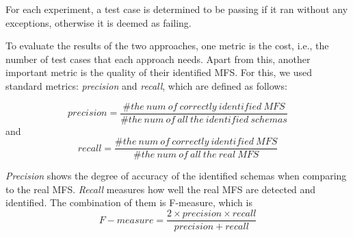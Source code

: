 \documentclass{sig-alternate}
\begin{document}
For each experiment, a test case is determined to be passing if it ran without any exceptions, otherwise it is deemed as failing.

To evaluate the results of the two approaches, one metric is the cost, i.e., the number of test cases that each approach needs. Apart from this, another important metric is the quality of their identified MFS. For this, we used standard metrics: \emph{precision} and \emph{recall}, which are defined as follows:

$$precision =  \frac{\#the\ num\ of\ correctly\ identified\  MFS}{\#the\ num\ of\ all\ the\ identified\ schemas}$$
and
$$recall  =  \frac{\#the\ num\ of\ correctly\ identified\  MFS}{\#the\ num\ of\ all\ the\ real\ MFS} $$

\emph{Precision} shows the degree of accuracy of the identified schemas when comparing to the real MFS. \emph{Recall} measures how well the real MFS are detected and identified. The combination of them is F-measure, which is
$$F-measure = \frac{2 \times precision \times recall}{precision + recall}$$
%
%
%
%


\end{document}
